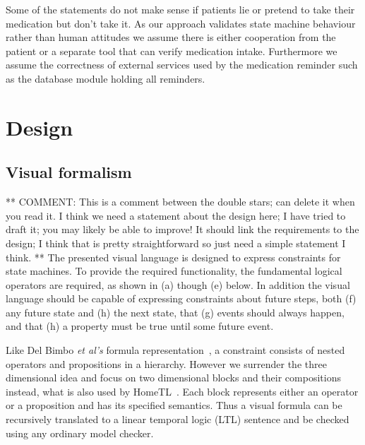 \documentclass[conference]{IEEEtran}
\begin{document}
Some of the statements do not make sense if patients lie or pretend to take their medication but don't take it. As our approach validates state machine behaviour rather than human attitudes we assume there is either cooperation from the patient or a separate tool that can verify medication intake. Furthermore we assume the correctness of external services used by the medication reminder such as the database module holding all reminders.



\section{Design}

\subsection{Visual formalism}
\label{sec:visualformalism}


** COMMENT: This is a comment between the double stars; can delete it when you read it. I think we need a statement about the design here; I have tried to draft it; you may likely be able to improve! It should link the requirements to the design; I think that is pretty straightforward so just need a simple statement I think. ** 
The presented visual language is designed to express constraints for state machines. To provide the required functionality, the fundamental logical operators are required, as shown in (a) though (e) below. In addition the visual language should be capable of expressing constraints about future steps, both (f) any future state and (h) the next state, that (g) events should always happen, and that (h) a property must be true until some future event.

 Like Del Bimbo {\em et al's} formula representation~\cite{520786}, a constraint consists of nested operators and propositions in a hierarchy. However we surrender the three dimensional idea and focus on two dimensional blocks and their compositions instead, what is also used by HomeTL~\cite{4341725}.
Each block represents either an operator or a proposition and has its specified semantics. Thus a visual formula can be recursively translated to a linear temporal logic (LTL) sentence and be checked using any ordinary model checker. 
\end{document}
